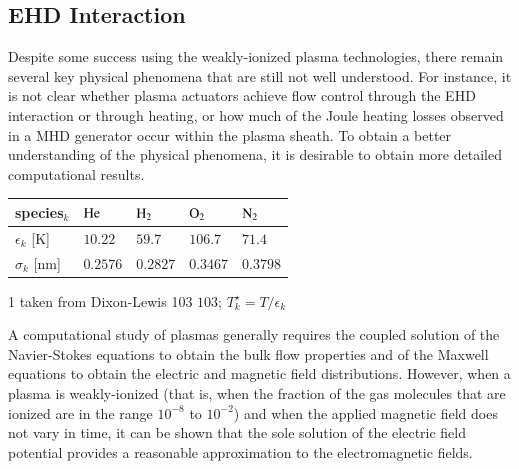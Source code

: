 \documentclass[twoside,9pt,twocolumn]{aiaa}
\begin{document}
\subsection{EHD Interaction}
Despite some success using the weakly-ionized plasma technologies, there remain several key physical phenomena that are still not well understood. For instance, it is not clear whether plasma actuators achieve flow control through the EHD interaction or through heating, or how much of the Joule heating losses observed in a MHD generator occur within the plasma sheath. To obtain a better understanding of the physical phenomena, it is desirable to obtain more detailed computational results. 
%
\begin{table}[ht]
\begin{center}
  \begin{threeparttable}
    \begin{tabular}{lllll}
      \toprule
species$_k$     &  ${\rm He}$    &  ${\rm H}_2$   &  ${\rm O}_2$   &  ${\rm N}_2$  \\
\midrule
$\epsilon_k$ [K]&  $10.22$       &  $59.7$        &  $106.7$       &  $71.4$       \\
$\sigma_k$ [nm] &  $0.2576$      &  $0.2827$      &  $0.3467$      &  $0.3798$     \\
      \bottomrule
    \end{tabular}
    \label{table:species-epssig}
    \begin{tablenotes}
      \item [1] taken from Dixon-Lewis 103 $103$; $T^\star_k=T/ \epsilon_k$
    \end{tablenotes}
  \end{threeparttable}
\end{center}
\end{table}
%

A computational study of plasmas generally requires the coupled solution of the Navier-Stokes equations to obtain the bulk flow properties and of the Maxwell equations to obtain the electric and magnetic field distributions. However, when a plasma is weakly-ionized (that is, when the fraction of the gas molecules that are ionized are in the range $10^{-8}$ to $10^{-2}$) and when the applied magnetic field does not vary in time, it can be shown that the sole solution of the  electric field potential provides a reasonable approximation to the electromagnetic fields. 
\end{document}
